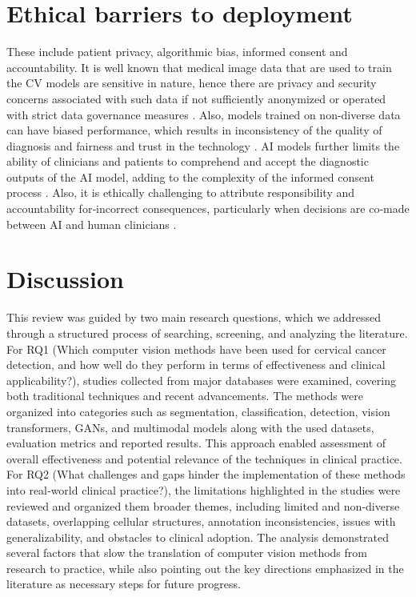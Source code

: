 \documentclass{svjour3}
\begin{document}
\section{Ethical barriers to deployment}
These include patient privacy, algorithmic bias, informed consent and accountability. It is well known that medical image data that are used to train the CV models are sensitive in nature, hence there are privacy and security concerns associated with such data if not sufficiently anonymized or operated with strict data governance measures \cite{124,125}. Also, models trained on non-diverse data can have biased performance, which results in inconsistency of the quality of diagnosis and fairness and trust in the technology \cite{150}.
AI models further limits the ability of clinicians and patients to comprehend and accept the diagnostic outputs of the AI model, adding to the complexity of the informed consent process \cite{6,7}. Also, it is ethically challenging to attribute responsibility and accountability for‑incorrect consequences, particularly when decisions are co‑made between AI and human clinicians \cite{151,152}.
\section{Discussion}
This review was guided by two main research questions, which we addressed through a structured process of searching, screening, and analyzing the literature. For RQ1 (Which computer vision methods have been used for cervical cancer detection, and how well do they perform in terms of effectiveness and clinical applicability?), studies collected from major databases were examined, covering both traditional techniques and recent advancements. The methods were organized into categories such as segmentation, classification, detection, vision transformers, GANs, and multimodal models along with the used datasets, evaluation metrics and reported results. This approach enabled assessment of overall effectiveness and potential relevance of the techniques in clinical practice.
For RQ2 (What challenges and gaps hinder the implementation of these methods into real‑world clinical practice?), the limitations highlighted in the studies were reviewed and organized them broader themes, including limited and non‑diverse datasets, overlapping cellular structures, annotation inconsistencies, issues with generalizability, and obstacles to clinical adoption. The analysis demonstrated several factors that slow the translation of computer vision methods from research to practice, while also pointing out the key directions emphasized in the literature as necessary steps for future progress.
\end{document}
